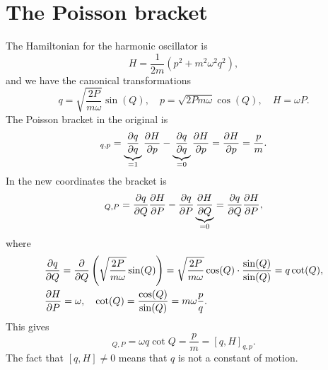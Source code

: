 \documentclass{article}
\begin{document}
    \section{The Poisson bracket}
    The Hamiltonian for the harmonic oscillator is
    \begin{equation*}
        H = \frac{1}{2m} \left(p^2 + m^2 \omega^2 q^2\right),
    \end{equation*}
    and we have the canonical transformations
    \begin{equation*}
        q = \sqrt{\frac{2P}{m \omega}} \sin(Q), \quad p = \sqrt{2 P m \omega} \cos(Q), \quad H = \omega P.
    \end{equation*}
    The Poisson bracket in the original is
    \begin{equation*}
        [q, H]_{q, p} = \underbrace{\pdv{q}{q}}_{=1}\pdv{H}{p} - \underbrace{\pdv{q}{q}}_{=0}\pdv{H}{p} = \pdv{H}{p} = \frac{p}{m}.
    \end{equation*} 
    In the new coordinates the bracket is
    \begin{equation*}
        [q, H]_{Q, P} = \pdv{q}{Q}\pdv{H}{P} - \pdv{q}{P} \underbrace{\pdv{H}{Q}}_{= 0} = \pdv{q}{Q}\pdv{H}{P},
    \end{equation*}
    where
    \begin{align*}
        & \pdv{q}{Q} = \pdv{Q}\left(\sqrt{\frac{2P}{m \omega}} \sin(Q)\right) = \sqrt{\frac{2P}{m \omega}} \cos(Q) \cdot \frac{\sin(Q)}{\sin(Q)} = q \cot(Q), \\
        & \pdv{H}{P} = \omega, \quad \cot(Q) = \frac{\cos(Q)}{\sin(Q)} = m \omega \frac{p}{q}.
    \end{align*}
    This gives 
    \begin{equation*}
        [q, H]_{Q, P} = \omega q \cot{Q} = \frac{p}{m} = [q, H]_{q, p}.
    \end{equation*}
    The fact that $[q, H] \neq 0$ means that $q$ is not a constant of motion.
\end{document}
